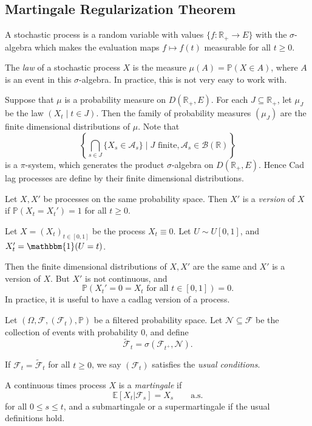 \documentclass[12pt]{article}
\begin{document}
\subsection{Martingale Regularization Theorem}%
\label{sub:mrt}

A stochastic process is a random variable with values $\{f : \mathbb{R}_+ \to E\}$ with the $\sigma$-algebra which makes the evaluation maps $f \mapsto f(t)$ measurable for all $t \geq 0$.

The \emph{law} of a stochastic process $X$ is the measure $\mu(A) = \mathbb{P}(X \in A)$, where $A$ is an event in this $\sigma$-algebra. In practice, this is not very easy to work with.

Suppose that $\mu$ is a probability measure on $D(\mathbb{R}_+, E)$. For each $J \subseteq \mathbb{R}_+$, let $\mu_J$ be the law $(X_t \mid t \in J)$. Then the family of probability measures $(\mu_J)$ are the finite dimensional distributions of $\mu$. Note that
\[
	\left\{ \bigcap_{s \in J} \{X_s \in \mathcal{A}_s\} \mid J \text{ finite}, \mathcal{A}_s \in \mathcal{B}(\mathbb{R})\right\}
\]
is a $\pi$-system, which generates the product $\sigma$-algebra on $D(\mathbb{R}_+, E)$. Hence Cad lag processes are define by their finite dimensional distributions.

\begin{definition}
	Let $X, X'$ be processes on the same probability space. Then $X'$ is a \emph{version} of $X$ if $\mathbb{P}(X_t = X_t') = 1$ for all $t \geq 0$.
\end{definition}

\begin{exbox}
	Let $X = (X_t)_{t \in [0, 1]}$ be the process $X_t\equiv 0$. Let $U \sim U[0, 1]$, and $X_t' = \mathbbm{1}(U = t)$.

	Then the finite dimensional distributions of $X, X'$ are the same and $X'$ is a version of $X$. But $X'$ is not continuous, and
	\[
		\mathbb{P}(X_t' = 0 = X_t \text{ for all }t \in [0, 1]) = 0.
	\]
	In practice, it is useful to have a cadlag version of a process.
\end{exbox}

Let $(\Omega, \mathcal{F}, (\mathcal{F}_t), \mathbb{P})$ be a filtered probability space. Let $\mathcal{N} \subseteq \mathcal{F}$ be the collection of events with probability $0$, and define
\[
	\tilde{\mathcal{F}}_t = \sigma(\mathcal{F}_{t^+}, \mathcal{N}).
\]

\begin{definition}
	If $\mathcal{F}_t = \tilde{\mathcal{F}}_t$ for all $t \geq 0$, we say $(\mathcal{F}_t)$ satisfies the \emph{usual conditions}.

	A continuous times process $X$ is a \emph{martingale} if
	\[
		\mathbb{E}[X_t | \mathcal{F}_s] = X_s \qquad\text{a.s.}
	\]
	for all $0 \leq s \leq t$, and a submartingale or a supermartingale if the usual definitions hold.
\end{definition}
\end{document}
